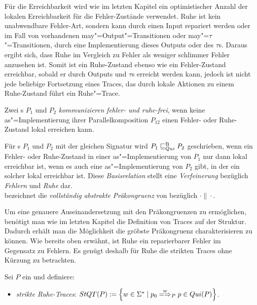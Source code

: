 Für die Erreichbarkeit wird wie im letzten Kapitel ein optimistischer Anzahl
der lokalen Erreichbarkeit für die Fehler-Zustände verwendet. Ruhe ist kein
unabwendbare \glqq Fehler-Art\grqq{}, sondern kann durch einen Input repariert
werden oder im Fall von vorhandenen may"=Output"=Transitionen oder
may"=$\tau$"=Transitionen, durch eine Implementierung dieses Outputs oder des
$\tau$s. Daraus ergibt sich, dass Ruhe im Vergleich zu Fehler als weniger \glqq
schlimmer Fehler\grqq{} anzusehen ist. Somit ist ein Ruhe-Zustand ebenso wie
ein Fehler-Zustand erreichbar, sobald er durch Outputs und $\tau$s erreicht
werden kann, jedoch ist nicht jede beliebige Fortsetzung eines Traces, das
durch lokale Aktionen zu einem Ruhe-Zustand führt ein Ruhe"=Trace.

\begin{Def}
  Zwei \MEIO{}s $P_1$ und $P_2$ \emph{kommunizieren fehler- und ruhe-frei},
  wenn keine as"=Implementierung ihrer Parallelkomposition $P_{12}$ einen
  Fehler- oder Ruhe-Zustand lokal erreichen kann.
\end{Def}

\begin{Def}
  \label{QBRelDef}
  Für \MEIO{}s $P_1$ und $P_2$ mit der gleichen Signatur wird $P_1 \sqsubseteq  _{Qui}^\mathrm{B} P_2$
  geschrieben, wenn ein Fehler- oder Ruhe-Zustand in einer as"=Implementierung
  von $P_1$ nur dann lokal erreichbar ist, wenn es auch eine
  as"=Implementierung von $P_2$ gibt, in der ein solcher lokal erreichbar ist.
  Diese \emph{Basisrelation} stellt eine \emph{Verfeinerung} bezüglich
  \emph{Fehlern} und \emph{Ruhe} dar.\\
  \QCRel{} bezeichnet die \emph{vollständig abstrakte Präkongruenz} von
  \QBRel{} bezüglich $\cdot\|\cdot$.
\end{Def}

Um eine genauere Auseinandersetzung mit den Präkongruenzen zu ermöglichen,
benötigt man wie im letzten Kapitel die Definition von Traces auf der Struktur.
Dadurch erhält man die Möglichkeit die gröbste Präkongruenz charakterisieren zu
können. Wie bereits oben erwähnt, ist Ruhe ein reparierbarer \glqq
Fehler\grqq{} im Gegensatz zu Fehlern. Es genügt deshalb für Ruhe die strikten
Traces ohne Kürzung zu betrachten.

\begin{Def}
  \label{RuheTraceDef}
  Sei $P$ ein \MEIO{} und definiere:
  \begin{itemize}
    \item \emph{strikte Ruhe-Traces}: $\StQT (P) := \left\{w\in\Sigma ^*\mid
      p_0 \weakmay[w]_P p\in Qui(P)\right\}$.
  \end{itemize}
\end{Def}


